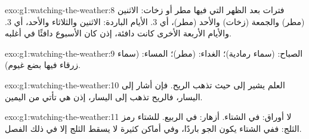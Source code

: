 \begin{solution}{exo:g1:watching-the-weather:8}
فترات بعد الظهر التي فيها مطر أو زخات: الاثنين (مطر) والجمعة (زخات) والأحد (مطر)، أي 3.
الأيام الباردة: الاثنين والثلاثاء والأحد، أي 3. والأيام الأربعة الأخرى كانت دافئة،
إذن كان الأسبوع دافئًا في أغلبه.
\end{solution}

\begin{solution}{exo:g1:watching-the-weather:9}
الصباح:  (سماء رمادية)؛ الغداء:  (مطر)؛
المساء:  (سماء زرقاء فيها بضع غيوم).
\end{solution}

\begin{solution}{exo:g1:watching-the-weather:10}
العلم يشير إلى حيث تذهب الريح. فإن أشار إلى اليسار، فالريح تذهب إلى
اليسار، إذن هي تأتي من اليمين.
\end{solution}

\begin{solution}{exo:g1:watching-the-weather:11}
لا أوراق: في الشتاء. أزهار: في الربيع. للشتاء رمز الثلج: ففي الشتاء
يكون الجو باردًا، وفي أماكن كثيرة لا يسقط الثلج إلا في ذلك الفصل.
\end{solution}
